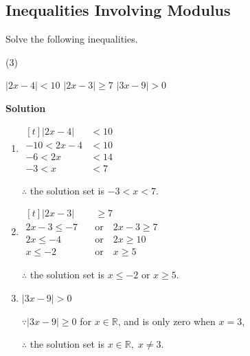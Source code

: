 \documentclass[11pt,a4paper]{book}
\newcommand{\R}{\mathbb{R}}
\begin{document}
\newpage

\subsection{Inequalities Involving Modulus}

\begin{example}{}

Solve the following inequalities.

\begin{tasks}[label=(\alph*),label-width=3.5ex](3)

\task $\left|2x-4\right|<10$
\task $\left|2x-3\right|\geq7$
\task $\left|3x-9\right|>0$

\end{tasks}

\textbf{Solution}

\begin{enumerate}[label=(\alph*),itemsep=1cm]

\item
$
\begin{aligned}[t]
\left|2x-4\right| & <10\\
-10<2x-4 & <10\\
-6<2x & <14\\
-3<x & <7
\end{aligned}
$

$\therefore$ the solution set is $-3<x<7$.

\item
$
\begin{aligned}[t]
\left|2x-3\right| & \geq7\\
2x-3\leq-7\quad & \text{or}\quad2x-3\geq7\\
2x\leq-4\quad & \text{or}\quad2x\geq10\\
x\leq-2\quad & \text{or}\quad x\geq5
\end{aligned}
$

$\therefore$ the solution set is $x\leq-2$ or $x\geq5$.

\item $\left|3x-9\right|>0$

$\because\left|3x-9\right|\geq0$ for $x\in\R$, and is only zero
when $x=3$,

$\therefore$ the solution set is $x\in\R,\;x\neq3$.

\end{enumerate}
\end{example}

\newpage
\end{document}
